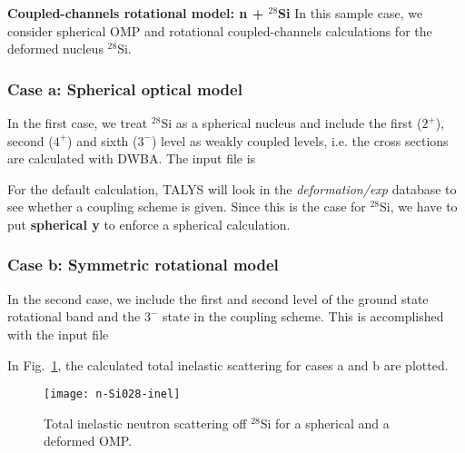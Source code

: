 \begin{samplecase}
{\bf Coupled-channels rotational model: n + ${}^{28}$Si}\newline
In this sample case, we consider spherical OMP and rotational coupled-channels
calculations for the deformed nucleus ${}^{28}$Si.
\subsubsection{Case a: Spherical optical model}
In the first case, we treat ${}^{28}$Si as a spherical nucleus and include
the first ($2^{+}$), second ($4^{+}$) and sixth ($3^{-}$) level as weakly
coupled levels, i.e. the cross sections are calculated with DWBA.
The input file is



For the default calculation, TALYS will look in the {\em deformation/exp}
database to see whether a coupling scheme is given. Since this is the case for
${}^{28}$Si, we have to put {\bf spherical y} to enforce a spherical
calculation.
\subsubsection{Case b: Symmetric rotational model}
In the second case,
we include the first and second level of the ground state rotational band
and the $3^{-}$ state in the coupling scheme. This is accomplished with the
input file


In Fig.~\ref{siinel}, the calculated total inelastic scattering for cases a and
b are plotted.
\end{samplecase}
\begin{figure}
\centering\texttt{[image: n-Si028-inel]}
\caption{Total inelastic neutron scattering off ${}^{28}$Si for a spherical
and a deformed OMP.}
\label{siinel}
\end{figure}

